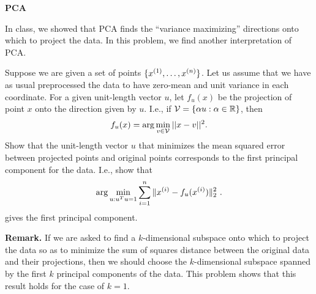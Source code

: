 \item {} {\bf PCA} 

In class, we showed that PCA finds the ``variance maximizing'' directions onto
which to project the data.  In this problem, we find another interpretation of PCA. 

Suppose we are given a set of points $\{x^{(1)},\ldots,x^{(\nexp)}\}$. Let us
assume that we have as usual preprocessed the data to have zero-mean and unit variance
in each coordinate.  For a given unit-length vector $u$, let $f_u(x)$ be the 
projection of point $x$ onto the direction given by $u$.  I.e., if 
${\cal V} = \{\alpha u : \alpha \in \Re\}$, then 
\[
f_u(x) = \arg \min_{v\in {\cal V}} ||x-v||^2.
\]
Show that the unit-length vector $u$ that minimizes the 
mean squared error between projected points and original points corresponds
to the first principal component for the data. I.e., show that
$$ \arg \min_{u:u^Tu=1} \sum_{i=1}^\nexp \|x^{(i)}-f_u(x^{(i)})\|_2^2 \ .$$
gives the first principal component.


{\bf Remark.} If we are asked to find a $k$-dimensional subspace onto which to
project the data so as to minimize the sum of squares distance between the
original data and their projections, then we should choose the $k$-dimensional
subspace spanned by the first $k$ principal components of the data.  This problem
shows that this result holds for the case of $k=1$.

\ifnum{} {
  
} \fi

